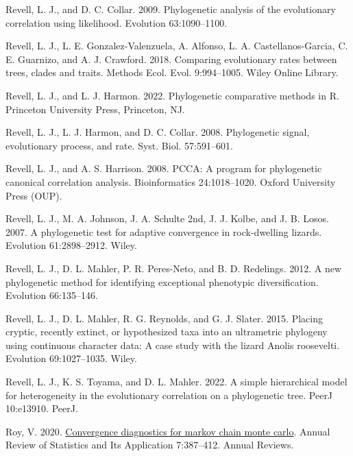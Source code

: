 \documentclass[fleqn,10pt,lineno]{wlpeerj} %
\newlength{\cslhangindent}
\newlength{\cslentryspacingunit} %
\newenvironment{CSLReferences}[2] %
 {%
  \setlength{\parindent}{0pt}
  \ifodd #1
  \let\oldpar\par
  \def\par{\hangindent=\cslhangindent\oldpar}
  \fi
  \setlength{\parskip}{#2\cslentryspacingunit}
 }%
 {}
\begin{document}
\begin{CSLReferences}{1}{0}
\leavevmode{}%
Revell, L. J., and D. C. Collar. 2009. Phylogenetic analysis of the evolutionary correlation using likelihood. Evolution 63:1090--1100.

\leavevmode{}%
Revell, L. J., L. E. Gonzalez-Valenzuela, A. Alfonso, L. A. Castellanos-Garcia, C. E. Guarnizo, and A. J. Crawford. 2018. Comparing evolutionary rates between trees, clades and traits. Methods Ecol. Evol. 9:994--1005. Wiley Online Library.

\leavevmode{}%
Revell, L. J., and L. J. Harmon. 2022. Phylogenetic comparative methods in {R}. Princeton University Press, Princeton, NJ.

\leavevmode{}%
Revell, L. J., L. J. Harmon, and D. C. Collar. 2008. Phylogenetic signal, evolutionary process, and rate. Syst. Biol. 57:591--601.

\leavevmode{}%
Revell, L. J., and A. S. Harrison. 2008. {PCCA}: A program for phylogenetic canonical correlation analysis. Bioinformatics 24:1018--1020. Oxford University Press (OUP).

\leavevmode{}%
Revell, L. J., M. A. Johnson, J. A. Schulte 2nd, J. J. Kolbe, and J. B. Losos. 2007. A phylogenetic test for adaptive convergence in rock-dwelling lizards. Evolution 61:2898--2912. Wiley.

\leavevmode{}%
Revell, L. J., D. L. Mahler, P. R. Peres-Neto, and B. D. Redelings. 2012. A new phylogenetic method for identifying exceptional phenotypic diversification. Evolution 66:135--146.

\leavevmode{}%
Revell, L. J., D. L. Mahler, R. G. Reynolds, and G. J. Slater. 2015. Placing cryptic, recently extinct, or hypothesized taxa into an ultrametric phylogeny using continuous character data: A case study with the lizard {Anolis} roosevelti. Evolution 69:1027--1035. Wiley.

\leavevmode{}%
Revell, L. J., K. S. Toyama, and D. L. Mahler. 2022. A simple hierarchical model for heterogeneity in the evolutionary correlation on a phylogenetic tree. PeerJ 10:e13910. PeerJ.

\leavevmode{}%
Roy, V. 2020. \href{https://doi.org/10.1146/annurev-statistics-031219-041300}{Convergence diagnostics for markov chain monte carlo}. Annual Review of Statistics and Its Application 7:387--412. Annual Reviews.


\end{CSLReferences}
\end{document}
